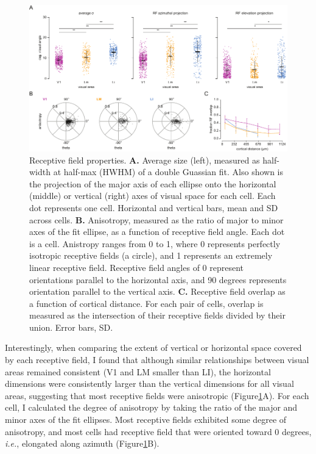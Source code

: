 \begin{figure}[t!]
    \includegraphics[width=\textwidth]{figures/chapter_3/fig_3-5_rf_aggregate/fig_3-5_rf_aggregate.pdf}
    \vspace{.1in}
    \caption[Receptive field properties]{Receptive field properties. 
    \textbf{A.} Average size (left), measured as half-width at half-max (HWHM) of a double Guassian fit. Also shown is the projection of the major axis of each ellipse onto the horizontal (middle) or vertical (right) axes of visual space for each cell. Each dot represents one cell. Horizontal and vertical bars, mean and SD across cells. 
    \textbf{B.} Anisotropy, measured as the ratio of major to minor axes of the fit ellipse, as a function of receptive field angle. Each dot is a cell. Anistropy ranges from 0 to 1, where 0 represents perfectly isotropic receptive fields (a circle), and 1 represents an extremely linear receptive field. Receptive field angles of 0 represent orientations parallel to the horizontal axis, and 90 degrees represents orientation parallel to the vertical axis.
    \textbf{C.} Receptive field overlap as a function of cortical distance. For each pair of cells, overlap is measured as the intersection of their receptive fields divided by their union. Error bars, SD.  
    \label{fig:rf_aggregate}}
\end{figure}

Interestingly, when comparing the extent of vertical or horizontal space covered by each receptive field, I found that although similar relationships between visual areas remained consistent (V1 and LM smaller than LI), the horizontal dimensions were consistently larger than the vertical dimensions for all visual areas, suggesting that most receptive fields were anisotropic (Figure\ref{fig:rf_aggregate}A). For each cell, I calculated the degree of anisotropy by taking the ratio of the major and minor axes of the fit ellipses. Most receptive fields exhibited some degree of anisotropy, and most cells had receptive field that were oriented toward 0 degrees, \textit{i.e.}, elongated along azimuth (Figure\ref{fig:rf_aggregate}B). 

